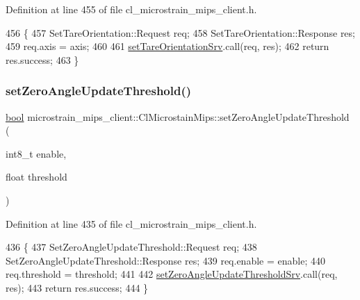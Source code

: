 Definition at line 455 of file cl\+\_\+microstrain\+\_\+mips\+\_\+client.\+h.


\begin{DoxyCode}
456     \{
457         SetTareOrientation::Request req;
458         SetTareOrientation::Response res;
459         req.axis = axis;
460 
461         \hyperlink{classmicrostrain__mips__client_1_1ClMicrostainMips_abd7ae5a9a62f4a571d05ad07ade23905}{setTareOrientationSrv}.call(req, res);
462         \textcolor{keywordflow}{return} res.success;
463     \}
\end{DoxyCode}
\mbox{\label{classmicrostrain__mips__client_1_1ClMicrostainMips_a670182955f928c633ac0038c315b0bf5}} 
\subsubsection{\texorpdfstring{set\+Zero\+Angle\+Update\+Threshold()}{setZeroAngleUpdateThreshold()}}
{\footnotesize\ttfamily \hyperlink{classbool}{bool} microstrain\+\_\+mips\+\_\+client\+::\+Cl\+Microstain\+Mips\+::set\+Zero\+Angle\+Update\+Threshold (\begin{DoxyParamCaption}\item[{int8\+\_\+t}]{enable,  }\item[{float}]{threshold }\end{DoxyParamCaption})\hspace{0.3cm}{\ttfamily [inline]}}



Definition at line 435 of file cl\+\_\+microstrain\+\_\+mips\+\_\+client.\+h.


\begin{DoxyCode}
436     \{
437         SetZeroAngleUpdateThreshold::Request req;
438         SetZeroAngleUpdateThreshold::Response res;
439         req.enable = enable;
440         req.threshold = threshold;
441 
442         \hyperlink{classmicrostrain__mips__client_1_1ClMicrostainMips_aa512e932514eba1022ac4453942dfb68}{setZeroAngleUpdateThresholdSrv}.call(req, res);
443         \textcolor{keywordflow}{return} res.success;
444     \}
\end{DoxyCode}


